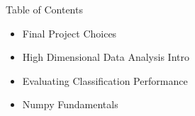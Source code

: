 \documentclass{beamer}
\begin{document}




















\begin{frame}{Table of Contents}
\begin{itemize}[label=$\vartriangleright$]
	\item Final Project Choices
\end{itemize}
\begin{itemize}[label=$\vartriangleright$]
	\item High Dimensional Data Analysis Intro
\end{itemize}
\begin{itemize}[label=$\blacktriangleright$]
	\item Evaluating Classification Performance
\end{itemize}
\begin{itemize}[label=$\vartriangleright$]
	\item Numpy Fundamentals
\end{itemize}
\end{frame}
\end{document}
